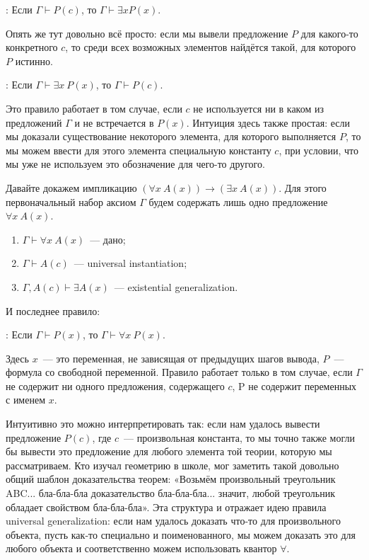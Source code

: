 : Если $\Gamma \vdash P(c)$, то $\Gamma\vdash \exists x P(x)$.

Опять же тут довольно всё просто: если мы вывели предложение $P$ для какого-то конкретного $c$, то среди всех возможных элементов найдётся такой, для которого $P$ истинно.

: Если $\Gamma \vdash \exists x\ P(x)$, то $\Gamma \vdash P(c)$.

Это правило работает в том случае, если $c$ не используется ни в каком из предложений $\Gamma$ и не встречается в $P(x)$. Интуиция здесь также простая: если мы доказали существование некоторого элемента, для которого выполняется $P$, то мы можем ввести для этого элемента специальную константу $c$, при условии, что мы уже не используем это обозначение для чего-то другого.


\begin{example}
Давайте докажем импликацию $(\forall x\ A(x)) \to (\exists x\ A(x))$. Для этого первоначальный набор аксиом $\Gamma$ будем содержать лишь одно предложение $\forall x\ A(x)$.
\begin{enumerate}
\item $\Gamma\vdash \forall x\ A(x)$~— дано;
\item $\Gamma \vdash A(c)$~— universal instantiation;
\item $\Gamma, A(c) \vdash \exists A(x)$~— existential generalization.
\end{enumerate}
\end{example}

И последнее правило:

: Если $\Gamma \vdash P(x)$, то $\Gamma\vdash \forall x\ P(x)$.

Здесь $x$~— это переменная, не зависящая от предыдущих шагов вывода, $P$~— формула со свободной переменной. Правило работает только в том случае, если $\Gamma$ не содержит ни одного предложения, содержащего $c$, P не содержит переменных с именем $x$.

Интуитивно это можно интерпретировать так: если нам удалось вывести предложение $P(c)$, где $c$~— произвольная константа, то мы точно также могли бы вывести это предложение для любого элемента той теории, которую мы рассматриваем. Кто изучал геометрию в школе, мог заметить такой довольно общий шаблон доказательства теорем: «Возьмём произвольный треугольник ABC... бла-бла-бла доказательство бла-бла-бла... значит, любой треугольник обладает свойством бла-бла-бла». Эта структура и отражает идею правила universal generalization: если нам удалось доказать что-то для произвольного объекта, пусть как-то специально и поименованного, мы можем доказать это для любого объекта и соответственно можем использовать квантор $\forall$.

